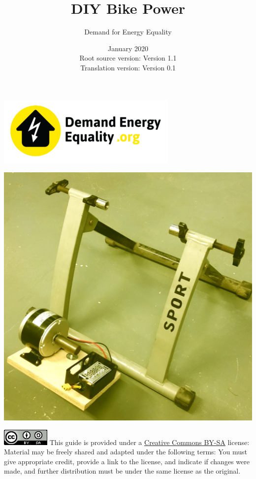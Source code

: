 \documentclass{article}
\title{DIY Bike Power}
\author{Demand for Energy Equality}
\date{January 2020 \\ Root source version: Version 1.1 \\ Translation version: Version 0.1}
\theoremstyle{definition}
\theoremstyle{definition}
\theoremstyle{remark}
\begin{document}
 
\maketitle{}

\begin{center}
  \includegraphics[width=0.25\paperwidth]{../Images/image_0_0_(demand_energy_equality).png}
\end{center}

\begin{center}
  \includegraphics[width=0.45\paperwidth]{../Images/image_0_1_(bike).png}
\end{center}

\vfill
  
\includegraphics[]{../Images/image_0_2_(license).png} \newline
This guide is provided under a \href{https://creativecommons.org/licenses/by-sa/4.0/legalcode}{\underline{Creative Commons BY-SA}} license: \newline
Material may be freely shared and adapted under the following terms: You must give appropriate credit, provide a link to the license, and indicate if changes were made, and further distribution must be under the same license as the original.
\end{document}

